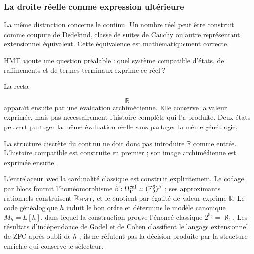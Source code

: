 \subsubsection{La droite réelle comme expression ultérieure}
La même distinction concerne le continu. Un nombre réel peut être construit comme coupure de Dedekind, classe de suites de Cauchy ou autre représentant extensionnel équivalent. Cette équivalence est mathématiquement correcte.\par
HMT ajoute une question préalable : quel système compatible d’états, de raffinements et de termes terminaux exprime ce réel ?\par
La recta\par
\[
\mathbb R
\]
apparaît ensuite par une évaluation archimédienne. Elle conserve la valeur exprimée, mais pas nécessairement l’histoire complète qui l’a produite. Deux états peuvent partager la même évaluation réelle sans partager la même généalogie.\par
La structure discrète du continu ne doit donc pas introduire \(\mathbb R\) comme entrée. L’histoire compatible est construite en premier ; son image archimédienne est exprimée ensuite.\par
L’entrelaceur avec la cardinalité classique est construit explicitement. Le codage par blocs fournit l’homéomorphisme \(\beta:\Omega_\Gamma^{\rm cal}\simeq(\mathbb F_3^6)^{\mathbb N}\) ; ses approximants rationnels construisent \(\mathbb R_{\rm HMT}\), et le quotient par égalité de valeur exprime \(\mathbb R\). Le code généalogique \(h\) induit le bon ordre et détermine le modèle canonique \(M_h=L[h]\), dans lequel la construction prouve l’énoncé classique \(2^{\aleph_0}=\aleph_1\). Les résultats d’indépendance de Gödel et de Cohen classifient le langage extensionnel de ZFC après oubli de \(h\) ; ils ne réfutent pas la décision produite par la structure enrichie qui conserve le sélecteur.\par
{}
